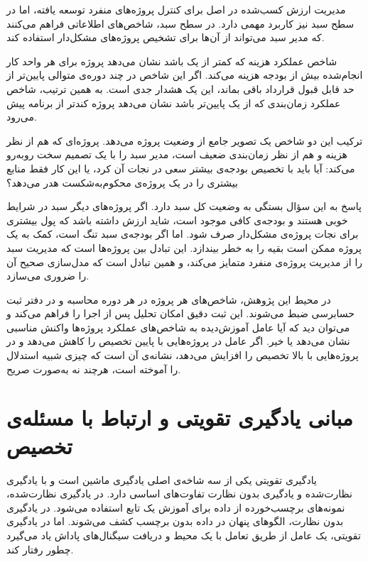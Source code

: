مدیریت ارزش کسب‌شده در اصل برای کنترل پروژه‌های منفرد توسعه
یافته، اما در سطح سبد نیز کاربرد مهمی دارد. در سطح سبد، شاخص‌های
 اطلاعاتی فراهم می‌کنند که مدیر سبد می‌تواند از آن‌ها
برای تشخیص پروژه‌های مشکل‌دار استفاده کند.

شاخص عملکرد هزینه که کمتر از یک باشد نشان می‌دهد پروژه برای هر
واحد کار انجام‌شده بیش از بودجه هزینه می‌کند. اگر این شاخص در
چند دوره‌ی متوالی پایین‌تر از حد قابل قبول قرارداد باقی بماند،
این یک هشدار جدی است. به همین ترتیب، شاخص عملکرد زمان‌بندی که
از یک پایین‌تر باشد نشان می‌دهد پروژه کندتر از برنامه پیش
می‌رود.

ترکیب این دو شاخص یک تصویر جامع از وضعیت پروژه می‌دهد. پروژه‌ای
که هم از نظر هزینه و هم از نظر زمان‌بندی ضعیف است، مدیر سبد را
با یک تصمیم سخت روبه‌رو می‌کند: آیا باید با تخصیص بودجه‌ی بیشتر
سعی در نجات آن کرد، یا این کار فقط منابع بیشتری را در یک پروژه‌ی
محکوم‌به‌شکست هدر می‌دهد؟

پاسخ به این سؤال بستگی به وضعیت کل سبد دارد. اگر پروژه‌های دیگر
سبد در شرایط خوبی هستند و بودجه‌ی کافی موجود است، شاید ارزش داشته
باشد که پول بیشتری برای نجات پروژه‌ی مشکل‌دار صرف شود. اما اگر
بودجه‌ی سبد تنگ است، کمک به یک پروژه ممکن است بقیه را به خطر بیندازد.
این تبادل بین پروژه‌ها است که مدیریت سبد را از مدیریت پروژه‌ی منفرد
متمایز می‌کند، و همین تبادل است که مدل‌سازی صحیح آن را ضروری می‌سازد.

در محیط این پژوهش، شاخص‌های  هر پروژه در هر دوره محاسبه
و در دفتر ثبت حسابرسی ضبط می‌شوند. این ثبت دقیق امکان تحلیل
پس از اجرا را فراهم می‌کند و می‌توان دید که آیا عامل آموزش‌دیده
به شاخص‌های عملکرد پروژه‌ها واکنش مناسبی نشان می‌دهد یا خیر.
اگر عامل در پروژه‌هایی با  پایین تخصیص را کاهش می‌دهد
و در پروژه‌هایی با  بالا تخصیص را افزایش می‌دهد، نشانه‌ی
آن است که چیزی شبیه استدلال  را آموخته است، هرچند نه
به‌صورت صریح.

\section{مبانی یادگیری تقویتی و ارتباط با مسئله‌ی تخصیص}
\label{sec:rl_basics}

یادگیری تقویتی یکی از سه شاخه‌ی اصلی یادگیری ماشین است و با
یادگیری نظارت‌شده و یادگیری بدون نظارت تفاوت‌های اساسی دارد.
در یادگیری نظارت‌شده، نمونه‌های برچسب‌خورده از داده برای آموزش
یک تابع استفاده می‌شود. در یادگیری بدون نظارت، الگوهای پنهان
در داده بدون برچسب کشف می‌شوند. اما در یادگیری تقویتی، یک
عامل از طریق تعامل با یک محیط و دریافت سیگنال‌های پاداش یاد
می‌گیرد چطور رفتار کند.

